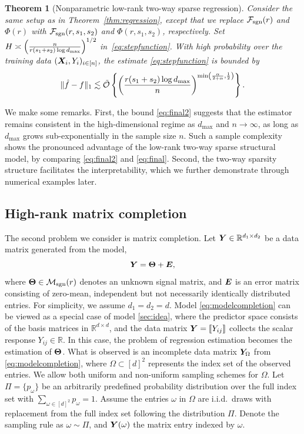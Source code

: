 \documentclass[aos]{imsart}
\newtheorem{theorem}{Theorem}%
\theoremstyle{definition}
\def\caliF{\tF_{\textup{sgn}}}
\def\caliM{\tM_{\textup{sgn}}}
\begin{document}
\begin{theorem}[Nonparametric low-rank two-way sparse regression]\label{thm:sparse}
Consider the same setup as in Theorem~\ref{thm:regression}, except that we replace $\caliF(r)$ and $\Phi(r)$ with $\caliF(r,s_1,s_2)$ and $\Phi(r,s_1,s_2)$, respectively. Set $H\asymp {\left(n\over r(s_1+s_2)\log d_{\max}\right)}^{1/2}$ in~\eqref{eq:stepfunction}. With high probability over the training data $(\bm X_i, Y_i)_{i\in[n]}$, the estimate \eqref{eq:stepfunction} is bounded by
\begin{equation}\label{eq:final2}
\onenormSize{}{\hat f- f} \lesssim \tilde \tO\left\{\left({r(s_1+s_2)\log d_{\max} \over n}\right)^{\min\left({\alpha\over 2+\alpha}, {1\over 2}\right)}\right\}.
\end{equation}
\end{theorem}

\noindent
We make some remarks. First, the bound \eqref{eq:final2} suggests that the estimator remains consistent in the high-dimensional regime as $d_{\max}$ and $n\to \infty$, as long as $d_{\max}$ grows sub-exponentially in the sample size $n$. Such a sample complexity shows the pronounced advantage of the low-rank two-way sparse structural model, by comparing \eqref{eq:final2} and \eqref{eq:final}. Second, the two-way sparsity structure facilitates the interpretability, which we further demonstrate through numerical examples later. 



\subsection{High-rank matrix completion}\label{sec:matrixcompletion}

The second problem we consider is matrix completion. Let $\bm Y\in\mathbb{R}^{d_1\times d_2}$ be a data matrix generated from the model,
\begin{equation}\label{eq:modelcompletion}
\mY=\mTheta+\mE,
\end{equation}
where $\mTheta\in\caliM(r)$ denotes an unknown signal matrix, and $\bm{E}$ is an error matrix consisting of zero-mean, independent but not necessarily identically distributed entries. For simplicity, we assume $d_1=d_2=d$. Model \eqref{eq:modelcompletion} can be viewed as a special case of model \eqref{sec:idea}, where the predictor space consists of the basis matrices in $\mathbb{R}^{d\times d}$, and the data matrix $\bm Y=\llbracket Y_{ij} \rrbracket$ collects the scalar response $Y_{ij} \in \mathbb{R}$. In this case, the problem of regression estimation becomes the estimation of $\bm{\Theta}$. What is observed is an incomplete data matrix $\bm Y_\Omega$ from \eqref{eq:modelcompletion}, where $\Omega \subset [d]^2$ represents the index set of the observed entries. We allow both uniform and non-uniform sampling schemes for $\Omega$. Let $\Pi=\{p_\omega\}$ be an arbitrarily predefined probability distribution over the full index set with $\sum_{\omega\in[d]^2}p_\omega=1$. Assume the entries $\omega$ in $\Omega$ are i.i.d.\ draws with replacement from the full index set following the distribution $\Pi$. Denote the sampling rule as $\omega \sim \Pi$, and $\bm Y(\omega)$ the matrix entry indexed by $\omega$.  
\end{document}
